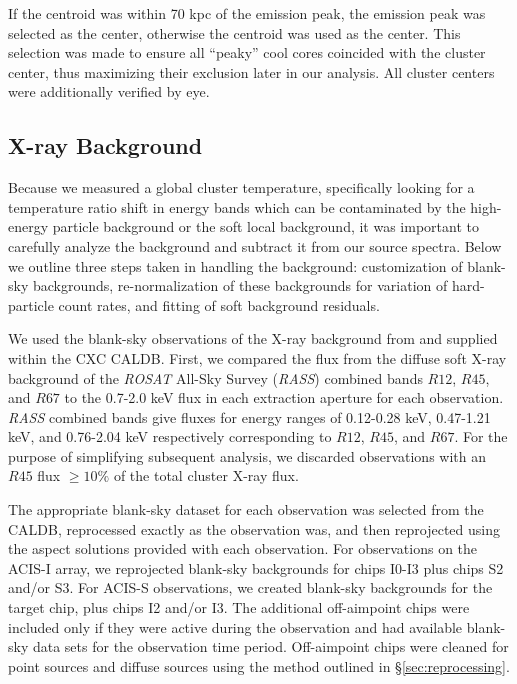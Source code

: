 \documentclass[12pt,preprint]{aastex}
\begin{document}
If the centroid was within 70 kpc of the emission peak, the emission
peak was selected as the center, otherwise the centroid was used
as the center. This selection was made to ensure all ``peaky'' cool
cores coincided with the cluster center, thus maximizing their
exclusion later in our analysis. All cluster centers were additionally
verified by eye.

\subsection{X-ray Background} \label{sec:background}

Because we measured a global cluster temperature, specifically looking
for a temperature ratio shift in energy bands which can be
contaminated by the high-energy particle background or the soft local
background, it was important to carefully analyze the background and
subtract it from our source spectra. Below we outline three steps
taken in handling the background: customization of blank-sky backgrounds,
re-normalization of these backgrounds for variation of hard-particle
count rates, and fitting of soft background residuals.

We used the blank-sky observations of the X-ray background from
\cite{2001ApJ...562L.153M} and supplied within the CXC
{\textsc{CALDB}}. First, we compared the flux from the diffuse soft
X-ray background of the {\it{ROSAT}} All-Sky Survey ({\it RASS})
combined bands $R12$, $R45$, and $R67$ to the 0.7-2.0 keV flux in each
extraction aperture for each observation. {\it RASS} combined bands
give fluxes for energy ranges of 0.12-0.28 keV, 0.47-1.21 keV, and
0.76-2.04 keV respectively corresponding to $R12$, $R45$, and $R67$. For
the purpose of simplifying subsequent analysis, we discarded
observations with an $R45$ flux $\geq 10\%$ of the total cluster X-ray
flux.

The appropriate blank-sky dataset for each observation was
selected from the {\textsc{CALDB}}, reprocessed exactly as the
observation was, and then reprojected using the aspect solutions provided
with each observation. For observations on the ACIS-I array, we
reprojected blank-sky backgrounds for chips I0-I3 plus chips S2 and/or
S3. For ACIS-S observations, we created blank-sky backgrounds for
the target chip, plus chips I2 and/or I3. The additional off-aimpoint
chips were included only if they were active during the observation
and had available blank-sky data sets for the observation time
period. Off-aimpoint chips were cleaned for point sources and diffuse
sources using the method outlined in \S\ref{sec:reprocessing}.
\end{document}
